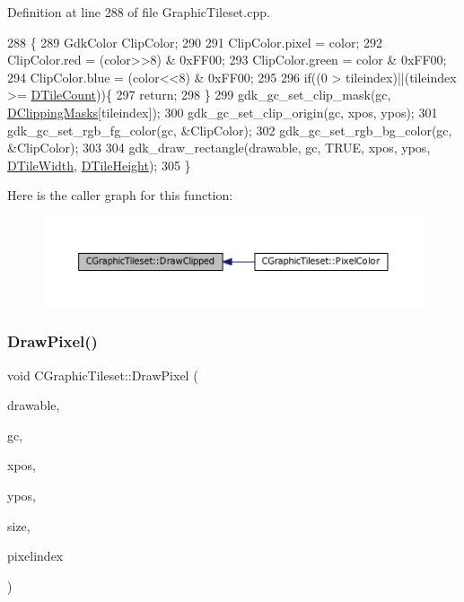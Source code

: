 Definition at line 288 of file Graphic\+Tileset.\+cpp.


\begin{DoxyCode}
288                                                                                                            
                \{
289     GdkColor ClipColor;
290     
291     ClipColor.pixel = color;
292     ClipColor.red = (color>>8) & 0xFF00;
293     ClipColor.green = color & 0xFF00;
294     ClipColor.blue = (color<<8) & 0xFF00;
295     
296     \textcolor{keywordflow}{if}((0 > tileindex)||(tileindex >= \hyperlink{classCGraphicTileset_a39d942b370e47f441bf97385eb1037c8}{DTileCount}))\{
297         \textcolor{keywordflow}{return};
298     \}
299     gdk\_gc\_set\_clip\_mask(gc, \hyperlink{classCGraphicTileset_a3761aec1b9a8bf189da5a7202d7fcac9}{DClippingMasks}[tileindex]);
300     gdk\_gc\_set\_clip\_origin(gc, xpos, ypos);
301     gdk\_gc\_set\_rgb\_fg\_color(gc, &ClipColor);
302     gdk\_gc\_set\_rgb\_bg\_color(gc, &ClipColor);
303     
304     gdk\_draw\_rectangle(drawable, gc, TRUE, xpos, ypos, \hyperlink{classCGraphicTileset_a2d0c7d19865b81911a3a43d5cae50e00}{DTileWidth}, 
      \hyperlink{classCGraphicTileset_af48f32e07d5fe69afd5f764318cc3244}{DTileHeight});
305 \}
\end{DoxyCode}
Here is the caller graph for this function\+:
\nopagebreak
\begin{figure}[H]
\begin{center}
\leavevmode
\includegraphics[width=350pt]{classCGraphicTileset_a104935351be4c465f3ff08c111455d19_icgraph}
\end{center}
\end{figure}
\hypertarget{classCGraphicTileset_a8acad7ebeb4fad53a72681851f323812}{}\label{classCGraphicTileset_a8acad7ebeb4fad53a72681851f323812} 
\subsubsection{\texorpdfstring{Draw\+Pixel()}{DrawPixel()}}
{\footnotesize\ttfamily void C\+Graphic\+Tileset\+::\+Draw\+Pixel (\begin{DoxyParamCaption}\item[{Gdk\+Drawable $\ast$}]{drawable,  }\item[{Gdk\+GC $\ast$}]{gc,  }\item[{gint}]{xpos,  }\item[{gint}]{ypos,  }\item[{int}]{size,  }\item[{int}]{pixelindex }\end{DoxyParamCaption})}



